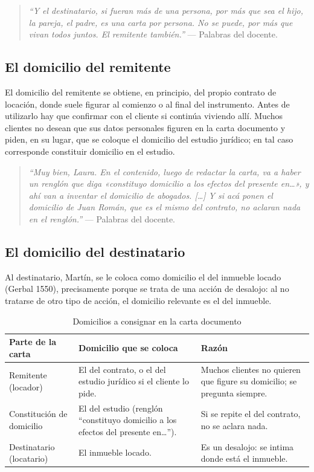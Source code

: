 \documentclass[12pt,oneside]{book}
\begin{document}
\begin{quote}
\textit{``Y el destinatario, si fueran más de una persona, por más que sea el hijo, la pareja, el padre, es una carta por persona. No se puede, por más que vivan todos juntos. El remitente también.''} --- Palabras del docente.
\end{quote}

\subsection*{El domicilio del remitente}

El domicilio del remitente se obtiene, en principio, del propio contrato de locación, donde suele figurar al comienzo o al final del instrumento. Antes de utilizarlo hay que confirmar con el cliente si continúa viviendo allí. Muchos clientes no desean que sus datos personales figuren en la carta documento y piden, en su lugar, que se coloque el domicilio del estudio jurídico; en tal caso corresponde constituir domicilio en el estudio.

\begin{quote}
\textit{``Muy bien, Laura. En el contenido, luego de redactar la carta, va a haber un renglón que diga «constituyo domicilio a los efectos del presente en…», y ahí van a inventar el domicilio de abogados. […] Y si acá ponen el domicilio de Juan Román, que es el mismo del contrato, no aclaran nada en el renglón.''} --- Palabras del docente.
\end{quote}

\subsection*{El domicilio del destinatario}

Al destinatario, Martín, se le coloca como domicilio el del inmueble locado (Gerbal 1550), precisamente porque se trata de una acción de desalojo: al no tratarse de otro tipo de acción, el domicilio relevante es el del inmueble.

\begin{table}[H]
\centering
\caption{Domicilios a consignar en la carta documento}
\begin{tabular}{@{}p{3.2cm}p{5.6cm}p{5.6cm}@{}}
\toprule
\textbf{Parte de la carta} & \textbf{Domicilio que se coloca} & \textbf{Razón} \\
\midrule
Remitente (locador) & El del contrato, o el del estudio jurídico si el cliente lo pide. & Muchos clientes no quieren que figure su domicilio; se pregunta siempre. \\
Constitución de domicilio & El del estudio (renglón ``constituyo domicilio a los efectos del presente en…''). & Si se repite el del contrato, no se aclara nada. \\
Destinatario (locatario) & El inmueble locado. & Es un desalojo: se intima donde está el inmueble. \\
\bottomrule
\end{tabular}
\end{table}
\end{document}
